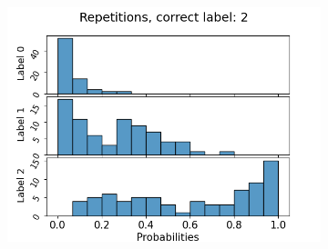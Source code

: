 \begin{figure}
\begin{subfigure}[t]{0.3\textwidth}
  \end{subfigure}
  ~
  \begin{subfigure}[t]{0.3\textwidth}
    \includegraphics[width=\textwidth]{files/figs/app/hists/femval/r2.png}
  \end{subfigure}


\end{figure}
